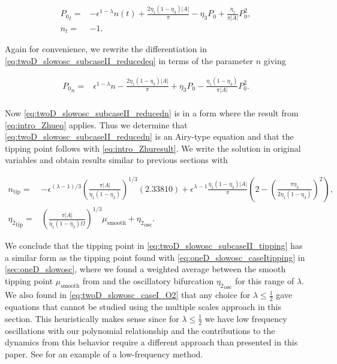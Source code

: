 \begin{equation}\label{eq:twoD_slowosc_subcaseII_reducedeq}
\begin{aligned}
{P_0}_t =& -\epsilon^{1-\lambda}n(t)+\frac{2\eta_1(1-\eta_3)|A|}{\pi}-\eta_3P_0+\frac{\eta_1}{\pi|A|}P_0^2,\\
n_t=&-1.
\end{aligned}
\end{equation}

Again for convenience, we rewrite the differentiation in \eqref{eq:twoD_slowosc_subcaseII_reducedeq} in terms of the parameter $n$ giving 

\begin{equation} \label{eq:twoD_slowosc_subcaseII_reducedn}
\begin{aligned}
{P_0}_n =& \epsilon^{1-\lambda} n -\frac{2\eta_1(1-\eta_3)|A|}{\pi}+\eta_3 P_0-\frac{\eta_1(1-\eta_3)}{\pi|A|}P_0^2.\\
\end{aligned}
\end{equation}

Now \eqref{eq:twoD_slowosc_subcaseII_reducedn} is in a form where the result from \eqref{eq:intro_Zhueq} applies. Thus we determine that \eqref{eq:twoD_slowosc_subcaseII_reducedn} is an Airy-type equation and that the tipping point follows with \eqref{eq:intro_Zhuresult}. We write the solution in original variables and obtain results similar to previous sections with

\begin{equation}\label{eq:twoD_slowosc_subcaseII_tipping}
\begin{aligned}
n_{\text{tip}} =& -\epsilon^{(\lambda-1)/3}\left(\frac{\pi|A|}{\eta_1(1-\eta_3)}\right)^{1/3}(2.33810)+\epsilon^{\lambda-1}\frac{\eta_1(1-\eta_3)|A|}{\pi}\left(2-\left(\frac{\pi\eta_3}{2\eta_1(1-\eta_3)}\right)^2\right),\\
{\eta_2}_{\text{tip}} =& \left(\frac{\pi|A|}{\eta_1(1-\eta_3)\Omega}\right)^{1/3}\mu_{\text{smooth}}+{\eta_2}_{\text{osc}}.
\end{aligned}
\end{equation}

\indent We conclude that the tipping point in \eqref{eq:twoD_slowosc_subcaseII_tipping} has a similar form as the tipping point found with \eqref{eq:oneD_slowosc_caseItipping} in \autoref{sec:oneD_slowosc}, where we found a weighted average between the smooth tipping point $\mu_{\text{smooth}}$ from \cite{zhu2015tipping} and the oscillatory bifurcation ${\eta_2}_{\text{osc}}$ for this range of $\lambda$. We also found in \eqref{eq:twoD_slowosc_caseI_O2} that any choice for $\lambda\le\frac{1}{2}$ gave equations that cannot be studied using the multiple scales approach in this section. This heuristically makes sense since for $\lambda\le \frac{1}{2}$ we have low frequency oscillations with our polynomial relationship and the contributions to the dynamics from this behavior require a different approach than presented in this paper. See \cite{zhu2015tipping} for an example of a low-frequency method.


